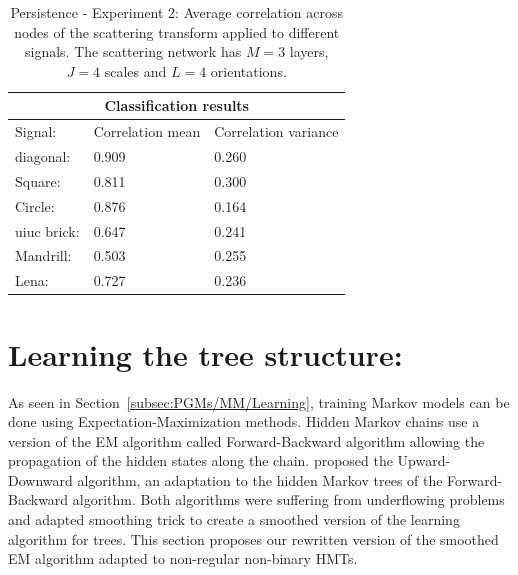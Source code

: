 \documentclass[a4paper,11pt]{report}
\begin{document}
		\begin{center}
			\begin{table}[h]
				\begin{center}				
					\begin{tabular}{|p{3cm}||p{4cm}|p{4cm}|}
						\hline
						\multicolumn{3}{|c|}{Classification results} \\
						\hline
						Signal:					&	Correlation mean	& Correlation variance	\\
						\hline
						diagonal:				& 0.909							& 0.260									\\
						Square:					& 0.811							& 0.300									\\
						Circle:					& 0.876							& 0.164									\\
						uiuc brick:			& 0.647							& 0.241									\\
						Mandrill:				& 0.503							& 0.255									\\
						Lena:						& 0.727							& 0.236									\\

						\hline
					\end{tabular}
				\end{center}
				\caption[Persistence - Experiment 2.]{\centering Persistence - Experiment 2: Average correlation across nodes of the scattering transform applied to different signals. The scattering network has $M=3$ layers, $J=4$ scales and $L=4$ orientations.}
				\label{table:Persistence - 2}
			\end{table}
		\end{center}
	
		
  \section{Learning the tree structure:}
    \label{sec:SCHMT/Learning}
    
    As seen in Section~\ref{subsec:PGMs/MM/Learning}, training Markov  models can be done using Expectation-Maximization methods. Hidden Markov chains use a version of the EM algorithm called Forward-Backward algorithm allowing the propagation of the hidden states along the chain. \citet{crouse1998wavelet} proposed the Upward-Downward algorithm, an adaptation to the hidden Markov trees of the Forward-Backward algorithm. Both algorithms were suffering from underflowing problems~\citep{ephraim2002hidden} and \citet{durand2004computational} adapted \citet{devijver1985baum} smoothing trick to create a smoothed version of the learning algorithm for trees. This section proposes our rewritten version of the smoothed EM algorithm adapted to non-regular non-binary HMTs.\\
       
\end{document}
